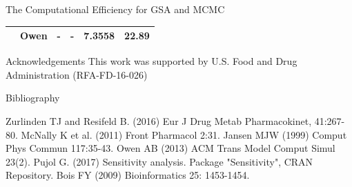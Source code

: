 \documentclass[xcolor=table]{beamer}
\begin{document}
\begin{frame}[t]
\begin{columns}[t]
\begin{column}{0.22\paperwidth}
\begin{block}{The Computational Efficiency for GSA and MCMC}
\begin{table}
\begin{adjustbox}{max width=\textwidth}
\begin{threeparttable}
\begin{tabular}{llcccc}
	    & Owen & - & - & 7.3558 &  22.89 \\
    \hline   
  \end{tabular}
   \end{threeparttable} 
   \end{adjustbox}
\end{table}
\end{block}
%
\begin{block}{Acknowledgements}
\small This work was supported by U.S. Food and Drug Administration (RFA-FD-16-026) \\
\end{block}
%
\begin{alertblock}{Bibliography}
\begin{thebibliography}{9}
{\footnotesize {}
Zurlinden TJ and Resifeld B. (2016) Eur J Drug Metab Pharmacokinet, 41:267-80.}
{\footnotesize {}
McNally K et al. (2011) Front Pharmacol 2:31.}
{\footnotesize {}
Jansen MJW (1999) Comput Phys Commun 117:35-43.}
{\footnotesize {}
Owen AB (2013) ACM Trans Model Comput Simul 23(2).}
{\footnotesize {}
Pujol G. (2017) Sensitivity analysis. Package "Sensitivity", CRAN Repository.}
{\footnotesize {}
Bois FY (2009) Bioinformatics 25: 1453-1454.}
\end{thebibliography}
\end{alertblock}


\end{column} %

\end{columns} %

\end{frame} %
\end{document}
